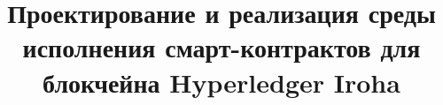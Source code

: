 \documentclass[12pt,a4paper]{article}
\begin{document}
\title{Проектирование и реализация среды исполнения смарт-контрактов для блокчейна Hyperledger Iroha}
\maketitle
\thispagestyle{empty}











\end{document}
